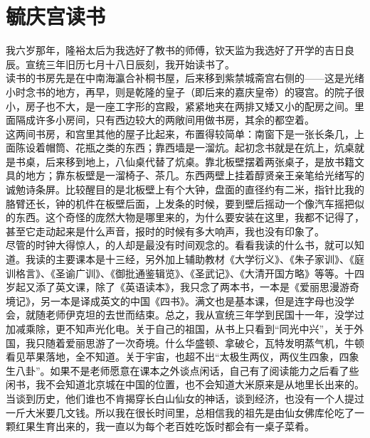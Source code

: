 \fancyhead[RO]{} %
\fancyhead[LE]{} %
\chapter*{毓庆宫读书}
\thispagestyle{empty}
我六岁那年，隆裕太后为我选好了教书的师傅，钦天监为我选好了开学的吉日良辰。宣统三年旧历七月十八日辰刻，我开始读书了。\\

读书的书房先是在中南海瀛合补桐书屋，后来移到紫禁城斋宫右侧的——这是光绪小时念书的地方，再早，则是乾隆的皇子（即后来的嘉庆皇帝）的寝宫。的院子很小，房子也不大，是一座工字形的宫殿，紧紧地夹在两排又矮又小的配房之间。里面隔成许多小房间，只有西边较大的两敞间用做书房，其余的都空着。\\

这两间书房，和宫里其他的屋子比起来，布置得较简单：南窗下是一张长条几，上面陈设着帽筒、花瓶之类的东西；靠西墙是一溜炕。起初念书就是在炕上，炕桌就是书桌，后来移到地上，八仙桌代替了炕桌。靠北板壁摆着两张桌子，是放书籍文具的地方；靠东板壁是一溜椅子、茶几。东西两壁上挂着醇贤亲王亲笔给光绪写的诚勉诗条屏。比较醒目的是北板壁上有个大钟，盘面的直径约有二米，指针比我的胳臂还长，钟的机件在板壁后面，上发条的时候，要到壁后摇动一个像汽车摇把似的东西。这个奇怪的庞然大物是哪里来的，为什么要安装在这里，我都不记得了，甚至它走动起来是什么声音，报时的时候有多大响声，我也没有印象了。\\

尽管的时钟大得惊人，的人却是最没有时间观念的。看看我读的什么书，就可以知道。我读的主要课本是十三经，另外加上辅助教材《大学衍义》、《朱子家训》、《庭训格言》、《圣谕广训》、《御批通鉴辑览》、《圣武记》、《大清开国方略》等等。十四岁起又添了英文课，除了《英语读本》，我只念了两本书，一本是《爱丽思漫游奇境记》，另一本是译成英文的中国《四书》。满文也是基本课，但是连字母也没学会，就随老师伊克坦的去世而结束。总之，我从宣统三年学到民国十一年，没学过加减乘除，更不知声光化电。关于自己的祖国，从书上只看到“同光中兴”，关于外国，我只随着爱丽思游了一次奇境。什么华盛顿、拿破仑，瓦特发明蒸气机，牛顿看见苹果落地，全不知道。关于宇宙，也超不出“太极生两仪，两仪生四象，四象生八卦”。如果不是老师愿意在课本之外谈点闲话，自己有了阅读能力之后看了些闲书，我不会知道北京城在中国的位置，也不会知道大米原来是从地里长出来的。当谈到历史，他们谁也不肯揭穿长白山仙女的神话，谈到经济，也没有一个人提过一斤大米要几文钱。所以我在很长时间里，总相信我的祖先是由仙女佛库伦吃了一颗红果生育出来的，我一直以为每个老百姓吃饭时都会有一桌子菜肴。\\

